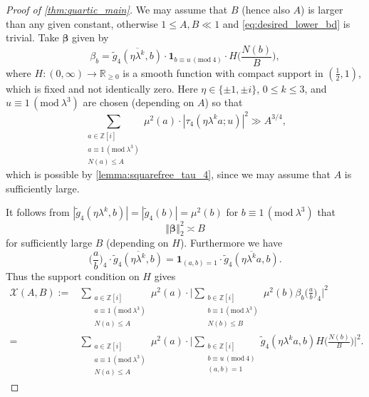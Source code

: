 \documentclass[12pt,reqno]{amsart}
\numberwithin{equation}{section}
\renewcommand{\pmod}[1]{\, (\mathrm{mod}\ #1)}
\newcommand\norm[1]{\left\Vert {#1} \right\Vert}
\newcommand{\Z}{\mathbb{Z}}
\begin{document}
\begin{proof}[Proof of \cref{thm:quartic_main}]
    We may assume that $B$ (hence also $A$) is larger than any given constant, otherwise $1 \leq A, B \ll 1$ and \eqref{eq:desired_lower_bd} is trivial. Take $\boldsymbol{\beta}$ given by
    \begin{equation*}
        \beta_b = \overline{\widetilde{g}_4(\eta \lambda^k, b)} \cdot \mathbf{1}_{b \equiv u \pmod{4}} \cdot H\Big(\frac{N(b)}{B} \Big),
    \end{equation*}
    where $H:(0,\infty) \to \mathbb{R}_{\geq 0}$ is a smooth function with compact support in $(\frac{1}{2},1)$, which is fixed and not identically zero. Here $\eta \in \{\pm1, \pm i\}$, $0 \leq k\leq 3$, and $u \equiv 1 \pmod{\lambda^3}$ are chosen (depending on $A$) so that
    \begin{equation}\label{eq:tau_lower_assumption}
        \sum_{\substack{a \in \Z[i] \\ a \equiv 1 \pmod{\lambda^3} \\ N(a) \leq A}} \mu^2(a) \cdot |\tau_4(\eta \lambda^k a ; u)|^2 \gg A^{3/4},
    \end{equation}
    which is possible by \cref{lemma:squarefree_tau_4}, since we may assume that $A$ is sufficiently large. 
    
    It follows from $|{\widetilde{g}_4(\eta \lambda^k, b)}| = |{\widetilde{g}_4(b)}| = \mu^2(b)$ for $b \equiv 1 \pmod{\lambda^3}$ that
    \begin{equation}\label{eq:beta_L2_norm}
        \norm{\boldsymbol{\beta}}^2_2 \asymp B
    \end{equation}
    for sufficiently large $B$ (depending on $H$). Furthermore we have
    \begin{equation*}
        \Big(\frac{a}{b}\Big)_4 \cdot \overline{\widetilde{g}_4(\eta \lambda^k, b)} = \boldsymbol{1}_{(a, b) = 1} \cdot \overline{\widetilde{g}_4(\eta \lambda^k a, b)}.
    \end{equation*}
Thus the support condition on $H$ gives
    \begin{align} 
         \mathcal{X}(A, B) := & \sum_{\substack{ a \in \mathbb{Z}[i] \\ a \equiv 1 \pmod{\lambda^3} \\ N(a) \leq A  }} \mu^2(a) \cdot \Bigg | \sum_{\substack{ b \in \mathbb{Z}[i] \\ b \equiv 1 \pmod{\lambda^3} \\ N(b) \leq B }} \mu^2(b) \beta_b \Big(\frac{a}{b}\Big)_4  \Bigg|^2 \nonumber \\
         = & \sum_{\substack{ a \in \mathbb{Z}[i] \\ a \equiv 1 \pmod{\lambda^3} \\ N(a) \leq A  }} \mu^2(a) \cdot  \Bigg | \sum_{\substack{ b \in \mathbb{Z}[i] \\ b \equiv u \pmod{4} \\ (a, b) = 1}} \widetilde{g}_4(\eta \lambda^k a, b) H\Big(\frac{N(b)}{B}\Big) \Bigg |^2. \label{counter1}
    \end{align}


\end{proof}
\end{document}
